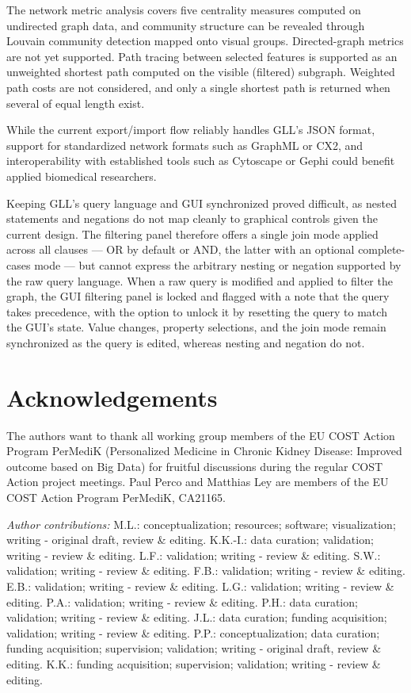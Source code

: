 The network metric analysis covers five centrality measures computed on undirected graph data, and community structure can be revealed through Louvain community detection mapped onto visual groups. Directed-graph metrics are not yet supported. Path tracing between selected features is supported as an unweighted shortest path computed on the visible (filtered) subgraph. Weighted path costs are not considered, and only a single shortest path is returned when several of equal length exist.

While the current export/import flow reliably handles GLL's JSON format, support for standardized network formats such as GraphML or CX2, and interoperability with established tools such as Cytoscape or Gephi could benefit applied biomedical researchers.

Keeping GLL's query language and GUI synchronized proved difficult, as nested statements and negations do not map cleanly to graphical controls given the current design. The filtering panel therefore offers a single join mode applied across all clauses — OR by default or AND, the latter with an optional complete-cases mode — but cannot express the arbitrary nesting or negation supported by the raw query language. When a raw query is modified and applied to filter the graph, the GUI filtering panel is locked and flagged with a note that the query takes precedence, with the option to unlock it by resetting the query to match the GUI's state. Value changes, property selections, and the join mode remain synchronized as the query is edited, whereas nesting and negation do not.

\section{Acknowledgements}
The authors want to thank all working group members of the EU COST Action Program PerMediK (Personalized Medicine in Chronic Kidney Disease: Improved outcome based on Big Data) for fruitful discussions during the regular COST Action project meetings. Paul Perco and Matthias Ley are members of the EU COST Action Program PerMediK, CA21165.

\textit{Author contributions:} M.L.: conceptualization; resources; software; visualization; writing - original draft, review \& editing. K.K.-I.: data curation; validation; writing - review \& editing. L.F.: validation; writing - review \& editing. S.W.: validation; writing - review \& editing. F.B.: validation; writing - review \& editing. E.B.: validation; writing - review \& editing. L.G.: validation; writing - review \& editing. P.A.: validation; writing - review \& editing. P.H.: data curation; validation; writing - review \& editing. J.L.: data curation; funding acquisition; validation; writing - review \& editing. P.P.: conceptualization; data curation; funding acquisition; supervision; validation; writing - original draft, review \& editing. K.K.: funding acquisition; supervision; validation; writing - review \& editing.


